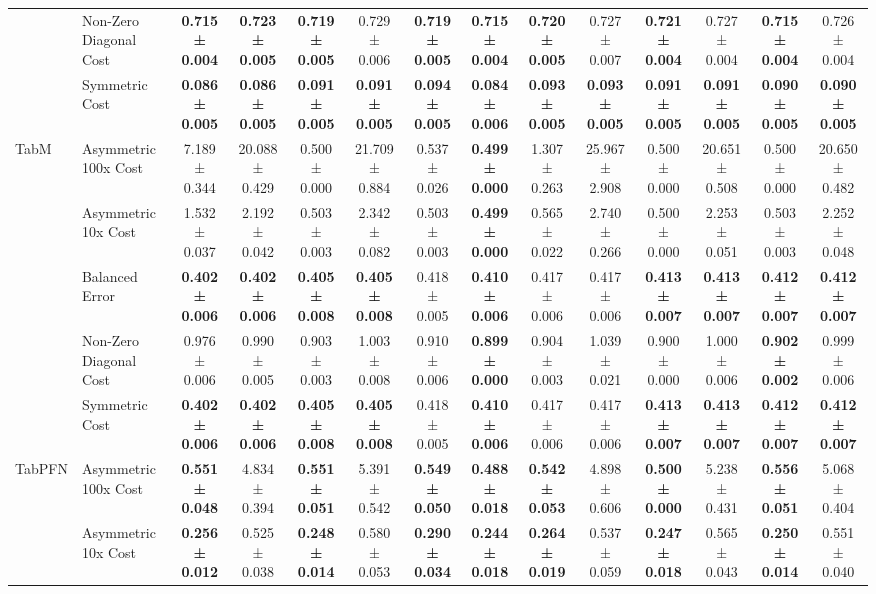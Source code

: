 \begin{table}[H]
{\begin{tabular}{llcccccccccccc}
 & Non-Zero Diagonal Cost & \textbf{0.715 ± 0.004} & \textbf{0.723 ± 0.005} & \textbf{0.719 ± 0.005} & 0.729 ± 0.006 & \textbf{0.719 ± 0.005} & \textbf{0.715 ± 0.004} & \textbf{0.720 ± 0.005} & 0.727 ± 0.007 & \textbf{0.721 ± 0.004} & 0.727 ± 0.004 & \textbf{0.715 ± 0.004} & 0.726 ± 0.004 \\
 & Symmetric Cost & \textbf{0.086 ± 0.005} & \textbf{0.086 ± 0.005} & \textbf{0.091 ± 0.005} & \textbf{0.091 ± 0.005} & \textbf{0.094 ± 0.005} & \textbf{0.084 ± 0.006} & \textbf{0.093 ± 0.005} & \textbf{0.093 ± 0.005} & \textbf{0.091 ± 0.005} & \textbf{0.091 ± 0.005} & \textbf{0.090 ± 0.005} & \textbf{0.090 ± 0.005} \\
\cline{1-14}
\multirow[t]{5}{*}{TabM} & Asymmetric 100x Cost & 7.189 ± 0.344 & 20.088 ± 0.429 & 0.500 ± 0.000 & 21.709 ± 0.884 & 0.537 ± 0.026 & \textbf{0.499 ± 0.000} & 1.307 ± 0.263 & 25.967 ± 2.908 & 0.500 ± 0.000 & 20.651 ± 0.508 & 0.500 ± 0.000 & 20.650 ± 0.482 \\
 & Asymmetric 10x Cost & 1.532 ± 0.037 & 2.192 ± 0.042 & 0.503 ± 0.003 & 2.342 ± 0.082 & 0.503 ± 0.003 & \textbf{0.499 ± 0.000} & 0.565 ± 0.022 & 2.740 ± 0.266 & 0.500 ± 0.000 & 2.253 ± 0.051 & 0.503 ± 0.003 & 2.252 ± 0.048 \\
 & Balanced Error & \textbf{0.402 ± 0.006} & \textbf{0.402 ± 0.006} & \textbf{0.405 ± 0.008} & \textbf{0.405 ± 0.008} & 0.418 ± 0.005 & \textbf{0.410 ± 0.006} & 0.417 ± 0.006 & 0.417 ± 0.006 & \textbf{0.413 ± 0.007} & \textbf{0.413 ± 0.007} & \textbf{0.412 ± 0.007} & \textbf{0.412 ± 0.007} \\
 & Non-Zero Diagonal Cost & 0.976 ± 0.006 & 0.990 ± 0.005 & 0.903 ± 0.003 & 1.003 ± 0.008 & 0.910 ± 0.006 & \textbf{0.899 ± 0.000} & 0.904 ± 0.003 & 1.039 ± 0.021 & 0.900 ± 0.000 & 1.000 ± 0.006 & \textbf{0.902 ± 0.002} & 0.999 ± 0.006 \\
 & Symmetric Cost & \textbf{0.402 ± 0.006} & \textbf{0.402 ± 0.006} & \textbf{0.405 ± 0.008} & \textbf{0.405 ± 0.008} & 0.418 ± 0.005 & \textbf{0.410 ± 0.006} & 0.417 ± 0.006 & 0.417 ± 0.006 & \textbf{0.413 ± 0.007} & \textbf{0.413 ± 0.007} & \textbf{0.412 ± 0.007} & \textbf{0.412 ± 0.007} \\
\cline{1-14}
\multirow[t]{5}{*}{TabPFN} & Asymmetric 100x Cost & \textbf{0.551 ± 0.048} & 4.834 ± 0.394 & \textbf{0.551 ± 0.051} & 5.391 ± 0.542 & \textbf{0.549 ± 0.050} & \textbf{0.488 ± 0.018} & \textbf{0.542 ± 0.053} & 4.898 ± 0.606 & \textbf{0.500 ± 0.000} & 5.238 ± 0.431 & \textbf{0.556 ± 0.051} & 5.068 ± 0.404 \\
 & Asymmetric 10x Cost & \textbf{0.256 ± 0.012} & 0.525 ± 0.038 & \textbf{0.248 ± 0.014} & 0.580 ± 0.053 & \textbf{0.290 ± 0.034} & \textbf{0.244 ± 0.018} & \textbf{0.264 ± 0.019} & 0.537 ± 0.059 & \textbf{0.247 ± 0.018} & 0.565 ± 0.043 & \textbf{0.250 ± 0.014} & 0.551 ± 0.040 \\

\end{tabular}}
\end{table}
